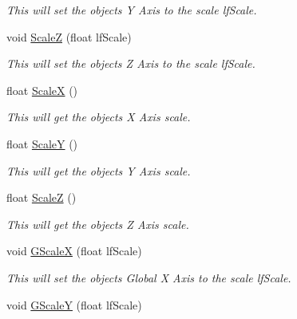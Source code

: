 \begin{DoxyCompactItemize}
\begin{DoxyCompactList}\small\item\em This will set the objects Y Axis to the scale lfScale. \end{DoxyCompactList}\item 
\hypertarget{classc_matrix4_afd1edcc26e0ff510c101b417f8c2dd36}{
void \hyperlink{classc_matrix4_afd1edcc26e0ff510c101b417f8c2dd36}{ScaleZ} (float lfScale)}
\label{classc_matrix4_afd1edcc26e0ff510c101b417f8c2dd36}

\begin{DoxyCompactList}\small\item\em This will set the objects Z Axis to the scale lfScale. \end{DoxyCompactList}\item 
\hypertarget{classc_matrix4_a952f122af09dcc26dae75b137874249c}{
float \hyperlink{classc_matrix4_a952f122af09dcc26dae75b137874249c}{ScaleX} ()}
\label{classc_matrix4_a952f122af09dcc26dae75b137874249c}

\begin{DoxyCompactList}\small\item\em This will get the objects X Axis scale. \end{DoxyCompactList}\item 
\hypertarget{classc_matrix4_abe36828ea2ddcee19612d4f136c49287}{
float \hyperlink{classc_matrix4_abe36828ea2ddcee19612d4f136c49287}{ScaleY} ()}
\label{classc_matrix4_abe36828ea2ddcee19612d4f136c49287}

\begin{DoxyCompactList}\small\item\em This will get the objects Y Axis scale. \end{DoxyCompactList}\item 
\hypertarget{classc_matrix4_a42eda4ea2a974f5b13591f083e45d14c}{
float \hyperlink{classc_matrix4_a42eda4ea2a974f5b13591f083e45d14c}{ScaleZ} ()}
\label{classc_matrix4_a42eda4ea2a974f5b13591f083e45d14c}

\begin{DoxyCompactList}\small\item\em This will get the objects Z Axis scale. \end{DoxyCompactList}\item 
\hypertarget{classc_matrix4_ac69f9e4ee1118580de8972e2b66da868}{
void \hyperlink{classc_matrix4_ac69f9e4ee1118580de8972e2b66da868}{GScaleX} (float lfScale)}
\label{classc_matrix4_ac69f9e4ee1118580de8972e2b66da868}

\begin{DoxyCompactList}\small\item\em This will set the objects Global X Axis to the scale lfScale. \end{DoxyCompactList}\item 
\hypertarget{classc_matrix4_af1cf539a6f87767feb23251fad0289c8}{
void \hyperlink{classc_matrix4_af1cf539a6f87767feb23251fad0289c8}{GScaleY} (float lfScale)}
\label{classc_matrix4_af1cf539a6f87767feb23251fad0289c8}


\end{DoxyCompactItemize}
